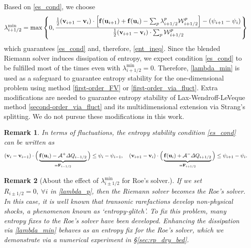 \documentclass[preprint, 11pt]{article}
\newcommand{\W}{{\mathcal W}}
\newcommand{\A}{{\mathcal A}}
\newcommand{\bff}{{\bf f}}
\newcommand{\bfF}{{\bf F}}
\newcommand{\bfu}{{\bf u}}
\newcommand{\bfv}{{\bf v}}
\newtheorem{remark}{Remark}
\begin{document}
Based on \eqref{es_cond}, we choose
\begin{align}\label{lambda_min}
  \lambda_{i+1/2}^{\min} = \max\left\{0,\frac{\frac{1}{2}(\bfv_{i+1}-\bfv_{i})\cdot\left[\bff(\bfu_{i+1})+\bff(\bfu_{i})-\sum_p\lambda_{i+1/2}^p\W_{i+1/2}^p\right]-(\psi_{i+1}-\psi_i)}{\frac{1}{2}(\bfv_{i+1}-\bfv_{i})\cdot\sum_p\W_{i+1/2}^p}\right\}
\end{align}
which guarantees \eqref{es_cond} and, therefore, \eqref{ent_ineq}. 
Since the blended Riemann solver induces dissipation of entropy, 
we expect condition \eqref{es_cond} to be fulfilled most of the times even with $\lambda_{i+1/2}^{\min}=0$. 
Therefore, \eqref{lambda_min} is used as a safeguard to guarantee entropy stability
for the one-dimensional problem using method \eqref{first-order_FV} or \eqref{first-order_via_fluct}. 
Extra modifications are needed to guarantee entropy stability of Lax-Wendroff-LeVeque method 
\eqref{second-order_via_fluct} and its multidimensional extension via Strang's splitting. 
We do not pursue these modifications in this work. 

\begin{remark}
In terms of fluctuations, the entropy stability condition \eqref{es_cond} can be written as 
\begin{align*}
  (\bfv_{i}-\bfv_{i-1})\cdot 
  \Big(
  \underbrace{\bff(\bfu_i)-\A^+\Delta Q_{i-1/2}}_{=\bfF_{i-1/2}}\Big)\leq \psi_{i}-\psi_{i-1},
  \quad
  (\bfv_{i+1}-\bfv_i)\cdot 
  \Big(\underbrace{\bff(\bfu_i)+\A^-\Delta Q_{i+1/2}}_{=\bfF_{i+1/2}}\Big)\leq \psi_{i+1}-\psi_i.
\end{align*}
\end{remark}

\begin{remark}[About the effect of $\lambda_{i\pm 1/2}^{\min}$ for Roe's solver.]
  If we set $R_{i\pm 1/2}=0, ~\forall i$ in \eqref{lambda_p}, then the Riemann solver becomes the Roe's solver.
  In this case, it is well known that transonic rarefactions develop non-physical shocks,
  a phenomenon known as `entropy-glitch'. To fix this problem, many entropy fixes to the Roe's
  solver have been developed. Enhancing the dissipation via \eqref{lambda_min} behaves as an entropy fix for
  the Roe's solver, which we demonstrate via a numerical experiment in \S \ref{sec:rp_dry_bed}. 
\end{remark}

\clearpage
\end{document}
